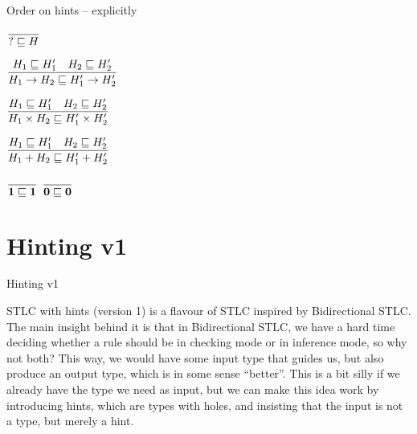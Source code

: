 \documentclass{beamer}
\newcommand{\Fun}[2]{#1 \to #2}
\newcommand{\Prod}[2]{#1 \times #2}
\newcommand{\Sum}[2]{#1 + #2}
\newcommand{\Unit}{\textbf{1}}
\newcommand{\Empty}{\textbf{0}}
\newcommand{\infrule}[3][]{\displaystyle \frac{#2}{#3} \textsc{\footnotesize{#1}}}
\begin{document}
\begin{frame}{Order on hints -- explicitly}


\begin{center}
  $\infrule{}{\hintorder{\Hint}{H}}$

  \vspace{2em}

  $\infrule{\hintorder{H_1}{H_1'} \quad \hintorder{H_2}{H_2'}}{\hintorder{\Fun{H_1}{H_2}}{\Fun{H'_1}{H'_2}}}$

  \vspace{2em}

  $\infrule{\hintorder{H_1}{H_1'} \quad \hintorder{H_2}{H_2'}}{\hintorder{\Prod{H_1}{H_2}}{\Prod{H_1'}{H_2'}}}$

  \vspace{2em}

  $\infrule{\hintorder{H_1}{H_1'} \quad \hintorder{H_2}{H_2'}}{\hintorder{\Sum{H_1}{H_2}}{\Sum{H_1'}{H_2'}}}$

  \vspace{2em}

  $\infrule{}{\hintorder{\Unit}{\Unit}}$ \quad
  $\infrule{}{\hintorder{\Empty}{\Empty}}$
\end{center}

\end{frame}

\section{Hinting v1}

\newcommand{\fullhinting}[4]{#1 \vdash #2 \mathcolor{blue}{\Leftarrow} #3 \mathcolor{red}{\Rightarrow} #4}
\newcommand{\hinting}[3]{\fullhinting{\Gamma}{#1}{#2}{#3}}

\begin{frame}{Hinting v1}

STLC with hints (version 1) is a flavour of STLC inspired by Bidirectional STLC. The main insight behind it is that in Bidirectional STLC, we have a hard time deciding whether a rule should be in checking mode or in inference mode, so why not both? This way, we would have some input type that guides us, but also produce an output type, which is in some sense ``better''. This is a bit silly if we already have the type we need as input, but we can make this idea work by introducing hints, which are types with holes, and insisting that the input is not a type, but merely a hint.

\end{frame}
\end{document}
